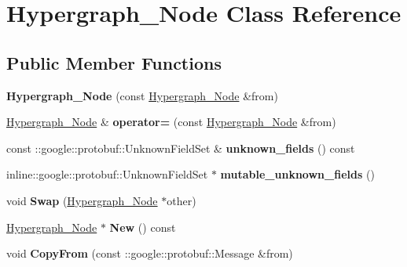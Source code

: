 \hypertarget{classHypergraph__Node}{
\section{Hypergraph\_\-Node Class Reference}
\label{classHypergraph__Node}
}
\subsection*{Public Member Functions}
\begin{DoxyCompactItemize}
\item 
\hypertarget{classHypergraph__Node_a8ff695bda4b12b720c6e45120843afa8}{
{\bfseries Hypergraph\_\-Node} (const \hyperlink{classHypergraph__Node}{Hypergraph\_\-Node} \&from)}
\label{classHypergraph__Node_a8ff695bda4b12b720c6e45120843afa8}

\item 
\hypertarget{classHypergraph__Node_a1c63124309d4c21c6f504de32472e6f4}{
\hyperlink{classHypergraph__Node}{Hypergraph\_\-Node} \& {\bfseries operator=} (const \hyperlink{classHypergraph__Node}{Hypergraph\_\-Node} \&from)}
\label{classHypergraph__Node_a1c63124309d4c21c6f504de32472e6f4}

\item 
\hypertarget{classHypergraph__Node_a5b1f1c8523851547fc23b811b9b3c983}{
const ::google::protobuf::UnknownFieldSet \& {\bfseries unknown\_\-fields} () const }
\label{classHypergraph__Node_a5b1f1c8523851547fc23b811b9b3c983}

\item 
\hypertarget{classHypergraph__Node_ad121adb128167ce797c6dd576956cdc1}{
inline::google::protobuf::UnknownFieldSet $\ast$ {\bfseries mutable\_\-unknown\_\-fields} ()}
\label{classHypergraph__Node_ad121adb128167ce797c6dd576956cdc1}

\item 
\hypertarget{classHypergraph__Node_a2436a5b49db8259590088f9a8024d77b}{
void {\bfseries Swap} (\hyperlink{classHypergraph__Node}{Hypergraph\_\-Node} $\ast$other)}
\label{classHypergraph__Node_a2436a5b49db8259590088f9a8024d77b}

\item 
\hypertarget{classHypergraph__Node_a93539f0390f6e4c4014b096d5dcf9226}{
\hyperlink{classHypergraph__Node}{Hypergraph\_\-Node} $\ast$ {\bfseries New} () const }
\label{classHypergraph__Node_a93539f0390f6e4c4014b096d5dcf9226}

\item 
\hypertarget{classHypergraph__Node_aca80a723aabad833f58bce2e69cfa1fc}{
void {\bfseries CopyFrom} (const ::google::protobuf::Message \&from)}
\label{classHypergraph__Node_aca80a723aabad833f58bce2e69cfa1fc}


\end{DoxyCompactItemize}
